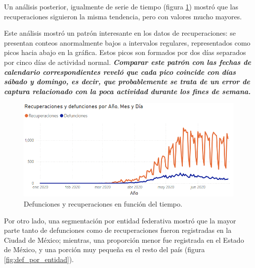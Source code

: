 \documentclass[a4paper,12pt]{article}
\begin{document}
Un análisis posterior, igualmente de serie de tiempo (figura \ref{fig:def_rec_por_tiempo}) mostró que las recuperaciones siguieron la misma tendencia, pero con valores mucho mayores.

Este análisis mostró un patrón interesante en los datos de recuperaciones: se presentan conteos anormalmente bajos a intervalos regulares, representados como picos hacia abajo en la gráfica.
Estos picos son formados por dos días separados por cinco días de actividad normal.
{\slshape {\bfseries Comparar este patrón con las fechas de calendario correspondientes reveló que cada pico coincide con días sábado y domingo, es decir, que probablemente se trata de un error de captura relacionado con la poca actividad durante los fines de semana.}}

\begin{figure}[!ht]
    \begin{center}
	\includegraphics[scale=0.6]{Def_rec_por_tiempo.png}
    \end{center}
    \captionsetup{width=\linewidth}
    \caption{Defunciones y recuperaciones en función del tiempo.}
    \label{fig:def_rec_por_tiempo}
\end{figure}

Por otro lado, una segmentación por entidad federativa mostró que la mayor parte tanto de defunciones como de recuperaciones fueron registradas en la Ciudad de México; mientras, una proporción menor fue registrada en el Estado de México, y una porción muy pequeña en el resto del país (figura \ref{fig:def_por_entidad}).
\end{document}
